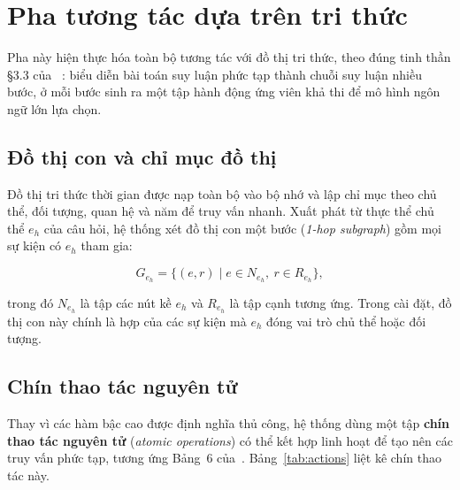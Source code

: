 \section{Pha tương tác dựa trên tri thức}
\label{sec:knowledge-based}

Pha này hiện thực hóa toàn bộ tương tác với đồ thị tri thức, theo đúng tinh thần §3.3 của~
\cite{chen2024ari}: biểu diễn bài toán suy luận phức tạp thành chuỗi suy luận nhiều bước, ở mỗi
bước sinh ra một tập hành động ứng viên khả thi để mô hình ngôn ngữ lớn lựa chọn.

\subsection{Đồ thị con và chỉ mục đồ thị}
\label{sec:onehop}

Đồ thị tri thức thời gian được nạp toàn bộ vào bộ nhớ và lập chỉ mục theo chủ thể, đối tượng, quan
hệ và năm để truy vấn nhanh. Xuất phát từ thực thể chủ thể $e_h$ của câu hỏi, hệ thống xét đồ thị
con một bước (\textit{1-hop subgraph}) gồm mọi sự kiện có $e_h$ tham gia:

\begin{equation}
\label{eq:subgraph}
G_{e_h} = \{(e, r) \mid e \in N_{e_h},\ r \in R_{e_h}\},
\end{equation}

trong đó $N_{e_h}$ là tập các nút kề $e_h$ và $R_{e_h}$ là tập cạnh tương ứng. Trong cài đặt, đồ
thị con này chính là hợp của các sự kiện mà $e_h$ đóng vai trò chủ thể hoặc đối tượng.

\subsection{Chín thao tác nguyên tử}
\label{sec:actions}

Thay vì các hàm bậc cao được định nghĩa thủ công, hệ thống dùng một tập \textbf{chín thao tác
nguyên tử} (\textit{atomic operations}) có thể kết hợp linh hoạt để tạo nên các truy vấn phức tạp,
tương ứng Bảng~6 của~\cite{chen2024ari}. Bảng~\ref{tab:actions} liệt kê chín thao tác này.

